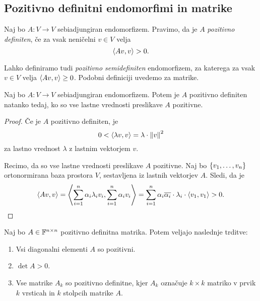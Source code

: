 \documentclass[12pt, a4paper]{article}
\begin{document}
\newpage

\subsection{Pozitivno definitni endomorfimi in matrike}

\begin{definicija}
Naj bo $A\colon V\to V$ sebiadjungiran endomorfizem. Pravimo, da je $A$ \emph{pozitivno definiten}, če za vsak neničelni $v\in V$ velja
\[
\left\langle Av,v\right\rangle>0.
\]
\end{definicija}

\begin{opomba}
Lahko definiramo tudi \emph{pozitivno semidefiniten} endomorfizem, za katerega za vsak $v\in V$ velja $\left\langle Av,v\right\rangle\geq 0$. Podobni definiciji uvedemo za matrike.
\end{opomba}

\begin{izrek}
Naj bo $A\colon V\to V$ sebiadjungiran endomorfizem. Potem je $A$ pozitivno definiten natanko tedaj, ko so vse lastne vrednosti preslikave $A$ pozitivne.
\end{izrek}

\begin{proof}
Če je $A$ pozitivno definiten, je
\[
0<\left\langle \lambda v,v\right\rangle=\lambda\cdot\left\lVert v\right\rVert^2
\]
za lastno vrednost $\lambda$ z lastnim vektorjem $v$.

Recimo, da so vse lastne vrednosti preslikave $A$ pozitivne. Naj bo $\left\{v_1,\dots,v_n\right\}$ ortonormirana baza prostora $V$, sestavljena iz lastnih vektorjev $A$. Sledi, da je
\[
\left\langle Av,v\right\rangle=\left\langle \sum_{i=1}^n\alpha_i\lambda_iv_i,\sum_{i=1}^n\alpha_iv_i\right\rangle=\sum_{i=1}^n\alpha_i\overline{\alpha_i}\cdot\lambda_i\cdot\left\langle v_1,v_1\right\rangle>0.\qedhere
\]
\end{proof}

\begin{trditev}
Naj bo $A\in\mathbb{F}^{n\times n}$ pozitivno definitna matrika. Potem veljajo naslednje trditve:

\begin{enumerate}
\item Vsi diagonalni elementi $A$ so pozitivni.
\item $\det A>0$.
\item Vse matrike $A_k$ so pozitivno definitne, kjer $A_k$ označuje $k\times k$ matriko v prvik $k$ vrsticah in $k$ stolpcih matrike $A$.
\end{enumerate}
\end{trditev}
\end{document}
